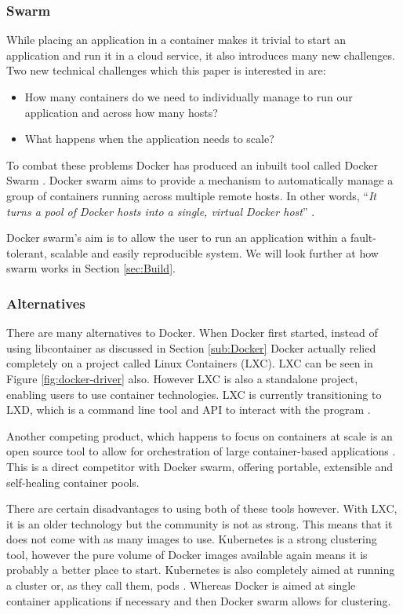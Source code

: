 \documentclass{article}
\begin{document}
\subsubsection{Swarm}
\label{subs:Swarm}
While placing an application in a container makes it trivial to start an application and run it in a cloud service, it also introduces many new challenges. Two new technical challenges which this paper is interested in are:
\begin{itemize}
  \item How many containers do we need to individually manage to run our application and across how many hosts? 
  \item What happens when the application needs to scale? 
\end{itemize}

To combat these problems Docker has produced an inbuilt tool called Docker Swarm \citep{Swarm2016}. Docker swarm aims to provide a mechanism to automatically manage a group of containers running across multiple remote hosts. In other words, ``\textit{It turns a pool of Docker hosts into a single, virtual Docker host}'' \citep{Swarm2016}.

Docker swarm's aim is to allow the user to run an application within a fault-tolerant, scalable and easily reproducible system. We will look further at how swarm works in Section \ref{sec:Build}.

\subsubsection{Alternatives}
\label{subs:Docker-alt}
There are many alternatives to Docker. When Docker first started, instead of using libcontainer as discussed in Section \ref{sub:Docker} Docker actually relied completely on a project called Linux Containers (LXC). LXC can be seen in Figure \ref{fig:docker-driver} also. However LXC is also a standalone project, enabling users to use container technologies. LXC is currently transitioning to LXD, which is a command line tool and API to interact with the program \citep{LXC2016}. 

Another competing product, which happens to focus on containers at scale is an open source tool to allow for orchestration of large container-based applications \citep{Kubernetes2016}. This is a direct competitor with Docker swarm, offering portable, extensible and self-healing container pools.

There are certain disadvantages to using both of these tools however. With LXC, it is an older technology but the community is not as strong. This means that it does not come with as many images to use. Kubernetes is a strong clustering tool, however the pure volume of Docker images available again means it is probably a better place to start. Kubernetes is also completely aimed at running a cluster or, as they call them, pods \citep{Kubernetes2016}. Whereas Docker is aimed at single container applications if necessary and then Docker swarm allows for clustering.
\end{document}
